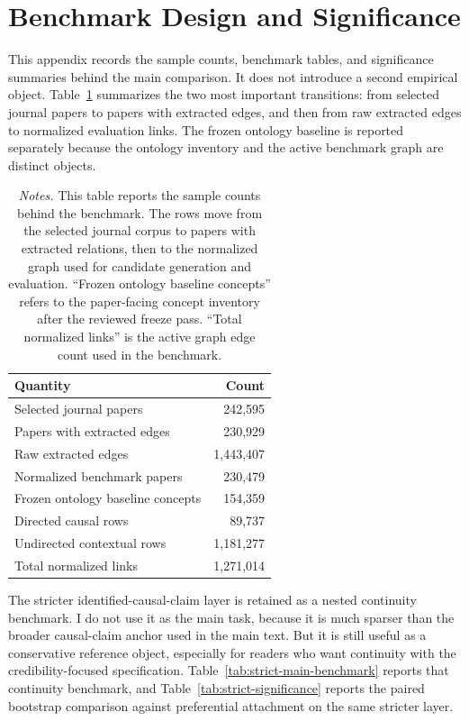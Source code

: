 \documentclass[11pt]{article}
\newcommand{\fignotes}[1]{\caption*{\textit{Notes.} #1}}
\begin{document}


\section{Benchmark Design and Significance}
\label{app:benchmark-details}

This appendix records the sample counts, benchmark tables, and significance summaries behind
the main comparison. It does not introduce a second empirical object. Table~\ref{tab:corpus-summary}
summarizes the two most important transitions: from selected journal papers to papers with
extracted edges, and then from raw extracted edges to normalized evaluation links. The
frozen ontology baseline is reported separately because the ontology inventory and the active
benchmark graph are distinct objects.

\begin{table}[h]
  \caption{Corpus and normalization summary}
  \label{tab:corpus-summary}
  \centering
  \begin{tabular}{lr}
    \toprule
    Quantity & Count \\
    \midrule
    Selected journal papers & 242{,}595 \\
    Papers with extracted edges & 230{,}929 \\
    Raw extracted edges & 1{,}443{,}407 \\
    Normalized benchmark papers & 230{,}479 \\
    Frozen ontology baseline concepts & 154{,}359 \\
    Directed causal rows & 89{,}737 \\
    Undirected contextual rows & 1{,}181{,}277 \\
    Total normalized links & 1{,}271{,}014 \\
    \bottomrule
  \end{tabular}
  \fignotes{This table reports the sample counts behind the benchmark. The rows move from the selected journal corpus to papers with extracted relations, then to the normalized graph used for candidate generation and evaluation. ``Frozen ontology baseline concepts'' refers to the paper-facing concept inventory after the reviewed freeze pass. ``Total normalized links'' is the active graph edge count used in the benchmark.}
\end{table}

The stricter identified-causal-claim layer is retained as a nested continuity
benchmark. I do not use it as the main task, because it is much sparser than
the broader causal-claim anchor used in the main text. But it is still useful as a
conservative reference object, especially for readers who want continuity with the
credibility-focused specification. Table~\ref{tab:strict-main-benchmark} reports that
continuity benchmark, and Table~\ref{tab:strict-significance} reports the paired bootstrap
comparison against preferential attachment on the same stricter layer.
\end{document}
